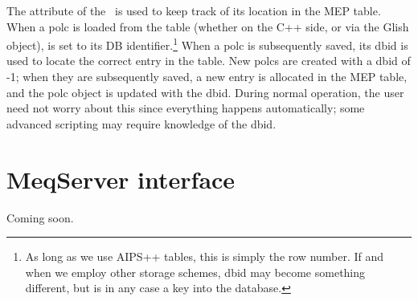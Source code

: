 \documentclass[10pt,twoside]{book}
\begin{document}
  The  attribute of the \Polc\ is used to keep track of its
  location in the MEP table. When a polc is loaded from the table (whether on
  the C++ side, or via the Glish  object),  is
  set to its DB identifier.\footnote{As long as we use AIPS++ tables, this is
  simply the row number. If and when we employ other storage schemes, dbid  may
  become something different, but is in any case a key into the database.} 
  When a polc is subsequently saved, its dbid is used to locate the correct
  entry in the table. New polcs are created with a dbid of -1; when they are
  subsequently saved, a new entry is allocated in the MEP table, and the polc
  object is updated with the dbid. During normal operation, the user need not
  worry about this since everything happens automatically; some advanced
  scripting may require knowledge of the dbid.

\chapter{MeqServer interface}

Coming soon.
\end{document}
